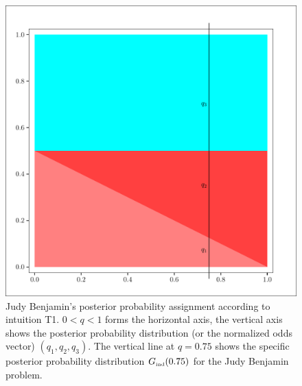 \documentclass[12pt]{article}
\def\lwv{.6}
\begin{document}
\begin{figure}[h]
  \begin{flushright}
    \begin{minipage}[h]{\lwv\linewidth}
      \includegraphics[width=\textwidth]{zeroone-unif.pdf}
      \caption{Judy Benjamin's posterior probability assignment
        according to intuition T1. $0<q<1$ forms the horizontal axis,
        the vertical axis shows the posterior probability distribution
        (or the normalized odds vector) $(q_{1},q_{2},q_{3})$. The
        vertical line at $q=0.75$ shows the specific posterior
        probability distribution $G_{\mbox{\tiny ind}}(0.75)$ for the Judy
        Benjamin problem.}
      \label{fig:unif}
    \end{minipage}
  \end{flushright}
\end{figure}
\end{document}
